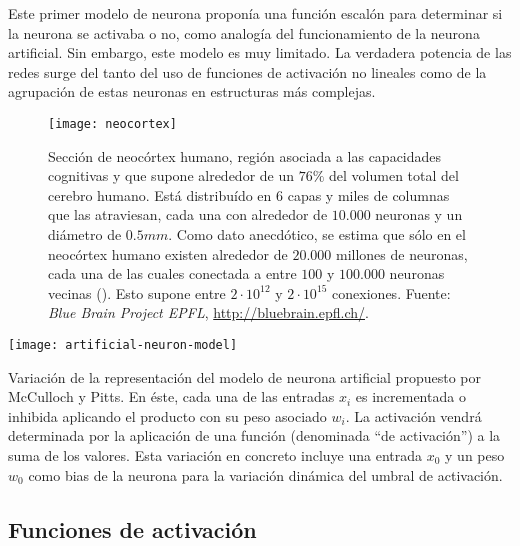 Este primer modelo de neurona proponía una función escalón para determinar si la neurona se activaba o no, como analogía del funcionamiento de la neurona artificial. Sin embargo, este modelo es muy limitado. La verdadera potencia de las redes surge del tanto del uso de funciones de activación no lineales como de la agrupación de estas neuronas en estructuras más complejas.

\begin{figure}[t]
	\centering
	\texttt{[image: neocortex]}
	\caption[Sección de neocórtex humano]{Sección de neocórtex humano, región asociada a las capacidades cognitivas y que supone alrededor de un $76\%$ del volumen total del cerebro humano. Está distribuído en $6$ capas y miles de columnas que las atraviesan, cada una con alrededor de $10.000$ neuronas y un diámetro de $0.5mm$.  Como dato anecdótico, se estima que sólo en el neocórtex humano existen alrededor de $20.000$ millones de neuronas, cada una de las cuales conectada a entre $100$ y $100.000$ neuronas vecinas (\cite{Pakkenberg1997}). Esto supone entre $2 \cdot 10^{12}$ y $2 \cdot 10^{15}$ conexiones. Fuente: \textit{Blue Brain Project EPFL}, \url{http://bluebrain.epfl.ch/}.}
	\label{fig:neocortex}
\end{figure}

\begin{marginfigure}
	\centering
	\texttt{[image: artificial-neuron-model]}
	\caption[Modelo de neurona artificial de McCulloch y Pitts]{Variación de la representación del modelo de neurona artificial propuesto por McCulloch y Pitts. En éste, cada una de las entradas $x_i$ es incrementada o inhibida aplicando el producto con su peso asociado $w_i$. La activación vendrá determinada por la aplicación de una función (denominada \enquote{de activación}) a la suma de los valores. Esta variación en concreto incluye una entrada $x_0$ y un peso $w_0$ como bias de la neurona para la variación dinámica del umbral de activación.}
	\label{fig:mccullocs-pitts-neuron-model}
\end{marginfigure}

\subsection{Funciones de activación}

